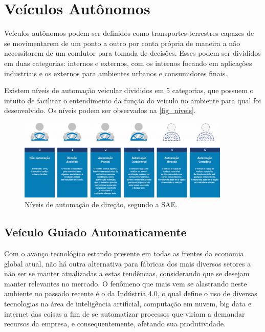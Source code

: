 \chapter{Ve{\'i}culos Aut{\^o}nomos}

Veículos autônomos podem ser definidos como transportes terrestres capazes de
se movimentarem de um ponto a outro por conta própria de maneira a não
necessitarem de um condutor para tomada de decisões. Esses podem ser divididos
em duas categorias: internos e externos, com os internos focando em aplicações
industriais e os externos para ambientes urbanos e consumidores finais.

Existem níveis de automação veicular divididos em 5 categorias, que possuem o
intuito de facilitar o entendimento da função do veículo no ambiente para qual
foi desenvolvido. Os níveis podem ser observados na \autoref{fig_niveis}.

\begin{figure}[htb]
        \centering
        \caption{\label{fig_niveis}Níveis de automação de direção, segundo a SAE.}
        \includegraphics[width=0.9\textwidth]{images/nhtsa_sae_automation_levels1-1024x391.png}
\end{figure}

\section{Ve{\'i}culo Guiado Automaticamente}

Com o avanço tecnológico estando presente em todas as frentes da economia
global atual, não há outra alternativa para fábricas dos mais diversos setores
a não ser se manter atualizadas a estas tendências, considerando que se desejam
manter relevantes no mercado. O fenômeno que mais vem se alastrando neste
ambiente no passado recente é o da Indústria 4.0, o qual define o uso de
diversas tecnologias na área de inteligência artificial, computação em nuvem,
big data e internet das coisas a fim de se automatizar processos que viriam a
demandar recursos da empresa, e consequentemente, afetando sua produtividade.

